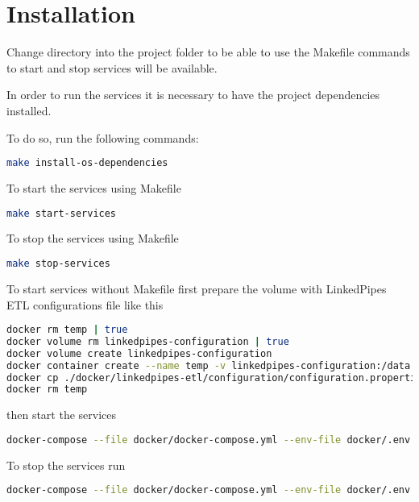 \section{Installation}
\label{sec:installation}


	Change directory into the project folder to be able to use the Makefile commands to start and stop services will be available. 	

	In order to run the services it is necessary to have the project dependencies installed. 

	To do so, run the following commands:
	
	\begin{lstlisting}[language=bash,]
make install-os-dependencies
	\end{lstlisting}
	
	To start the services using Makefile

\begin{lstlisting}[language=bash,]
make start-services
\end{lstlisting}

	To stop the services using Makefile
	
\begin{lstlisting}[language=bash,]
make stop-services
\end{lstlisting}		

	To start services without Makefile first prepare the volume with LinkedPipes ETL configurations file like this
	
\begin{lstlisting}[language=bash,]
docker rm temp | true
docker volume rm linkedpipes-configuration | true
docker volume create linkedpipes-configuration
docker container create --name temp -v linkedpipes-configuration:/data busybox
docker cp ./docker/linkedpipes-etl/configuration/configuration.properties temp:/data
docker rm temp
\end{lstlisting}		

	then start the services
	
\begin{lstlisting}[language=bash,]
docker-compose --file docker/docker-compose.yml --env-file docker/.env up -d
\end{lstlisting}

	To stop the services run

\begin{lstlisting}[language=bash,]
docker-compose --file docker/docker-compose.yml --env-file docker/.env down
\end{lstlisting}


